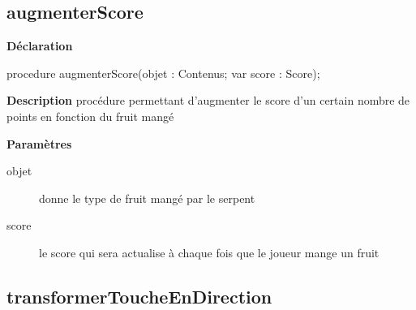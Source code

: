 \documentclass{report}
\newif\ifpdf
\begin{document}
\subsection*{augmenterScore}
\fi
\label{Jouer-augmenterScore}
\begin{list}{}{
\setlength{\itemindent}{0cm}
\setlength{\listparindent}{0cm}
\setlength{\leftmargin}{\evensidemargin}
\addtolength{\leftmargin}{\tmplength}
\settowidth{\labelsep}{X}
\addtolength{\leftmargin}{\labelsep}
\setlength{\labelwidth}{\tmplength}
}
\item[\textbf{Déclaration}\hfill]
\ifpdf
\begin{flushleft}
\fi
\begin{ttfamily}
procedure augmenterScore(objet : Contenus; var score : Score);\end{ttfamily}

\ifpdf
\end{flushleft}
\fi

\par
\item[\textbf{Description}]
procédure permettant d'augmenter le score d'un certain nombre de points en fonction du fruit mangé  \par
\item[\textbf{Paramètres}]
\begin{description}
\item[objet] donne le type de fruit mangé par le serpent
\item[score] le score qui sera actualise à chaque fois que le joueur mange un fruit
\end{description}


\end{list}
\ifpdf
\subsection*{\large{\textbf{transformerToucheEnDirection}}\normalsize\hspace{1ex}\hrulefill}
\else
\end{document}
